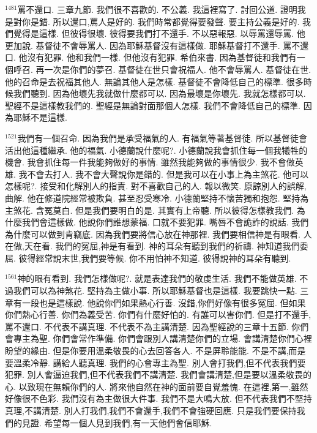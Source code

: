 \documentclass{book}
\begin{document}
$^{1481}$罵不還口.
三章九節.
我們很不喜歡的.
不公義.
我這裡寫了.
討回公道.
證明我是對你是錯.
所以還口,罵人是好的.
我們時常都覺得要發聲.
要主持公義是好的.
我們覺得是這樣.
但彼得很壞.
彼得要我們打不還手.
不以惡報惡.
以辱罵還辱罵.
他更加說.
基督徒不會辱罵人.
因為耶穌基督沒有這樣做.
耶穌基督打不還手.
罵不還口.
他沒有犯罪.
他和我們一樣.
但他沒有犯罪.
希伯來書.
因為基督徒和我們有一個呼召.
再一次是你們的夢召.
基督徒在世只會祝福人.
他不會辱罵人.
基督徒在世.
他的召命是去祝福其他人.
無論其他人是怎樣.
基督徒不會降低自己的標準.
很多時候我們聽到.
因為他壞先我就做什麼都可以.
因為最壞是你壞先.
我就怎樣都可以.
聖經不是這樣教我們的.
聖經是無論對面那個人怎樣.
我們不會降低自己的標準.
因為耶穌不是這樣.

$^{1521}$我們有一個召命.
因為我們是承受福氣的人.
有福氣等著基督徒.
所以基督徒會活出他這種繼承.
他的福氣.
小德蘭說什麼呢?.
小德蘭說我會抓住每一個我犧牲的機會.
我會抓住每一件我能夠做好的事情.
雖然我能夠做的事情很少.
我不會做英雄.
我不會去打人.
我不會大聲說你是錯的.
但是我可以在小事上為主煞花.
他可以怎樣呢?.
接受和化解別人的指責.
對不喜歡自己的人.
報以微笑.
原諒別人的誤解,曲解.
他在修道院經常被欺負.
甚至忍受寒冷.
小德蘭堅持不懷苦獨和抱怨.
堅持為主煞花.
含冤莫白.
但是我們要明白的是.
其實有上帝聽.
所以彼得怎樣教我們.
為什麼我們會這樣做.
他說你們誰想蒙福.
口就不要犯罪.
嘴唇不會詭詐的說話.
我們為什麼可以做到肯竊底.
因為我們要將信心放在神那裡.
我們要相信神是有眼看.
人在做,天在看.
我們的冤屈,神是有看到.
神的耳朵有聽到我們的祈禱.
神知道我們委屈.
彼得經常說末世,我們要等候.
你不用怕神不知道.
彼得說神的耳朵有聽到.

$^{1561}$神的眼有看到.
我們怎樣做呢?.
就是表達我們的敬虔生活.
我們不能做英雄.
不過我們可以為神煞花.
堅持為主做小事.
所以耶穌基督也是這樣.
我要跳快一點.
三章有一段也是這樣說.
他說你們如果熱心行善.
沒錯,你們好像有很多冤屈.
但如果你們熱心行善.
你們為義受苦.
你們有什麼好怕的.
有誰可以害你們.
但是打不還手,罵不還口.
不代表不講真理.
不代表不為主講清楚.
因為聖經說的三章十五節.
你們會專主為聖.
你們會常作準備.
你們會跟別人講清楚你們的立場.
會講清楚你們心裡盼望的緣由.
但是你要用溫柔敬畏的心去回答各人.
不是屏聆能能.
不是不講,而是要溫柔冷靜.
講給人聽真理.
我們的心會專主為聖.
別人會打我們,但不代表我們要犯罪.
別人會逼迫我們,但不代表我們不講清楚.
我們會講清楚,但是要以溫柔敬畏的心.
以致現在無賴你們的人.
將來他自然在神的面前要自覺羞愧.
在這裡,第一,雖然好像很不色彩.
我們沒有為主做很大件事.
我們不是大鳴大放.
但不代表我們不堅持真理,不講清楚.
別人打我們,我們不會還手,我們不會強硬回應.
只是我們要保持我們的見證.
希望每一個人見到我們,有一天他們會信耶穌.
\end{document}
